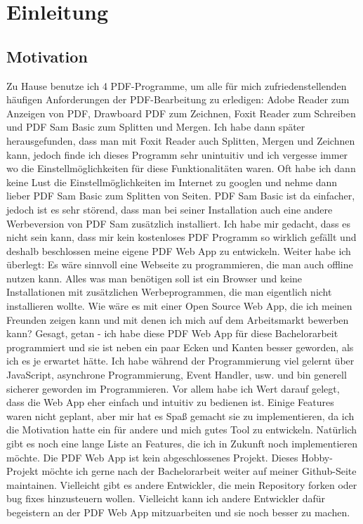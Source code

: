\chapter{Einleitung}

\section{Motivation}
Zu Hause benutze ich 4 PDF-Programme, um alle für mich zufriedenstellenden häufigen Anforderungen der PDF-Bearbeitung zu erledigen: Adobe Reader zum Anzeigen von PDF, Drawboard PDF zum Zeichnen, Foxit Reader zum Schreiben und PDF Sam Basic zum Splitten und Mergen. Ich habe dann später herausgefunden, dass man mit Foxit Reader auch Splitten, Mergen und Zeichnen kann, jedoch finde ich dieses Programm sehr unintuitiv und ich vergesse immer wo die Einstellmöglichkeiten für diese Funktionalitäten waren. Oft habe ich dann keine Lust die Einstellmöglichkeiten im Internet zu googlen und nehme dann lieber PDF Sam Basic zum Splitten von Seiten. PDF Sam Basic ist da einfacher, jedoch ist es sehr störend, dass man bei seiner Installation auch eine andere Werbeversion von PDF Sam zusätzlich installiert. Ich habe mir gedacht, dass es nicht sein kann, dass mir kein kostenloses PDF Programm so wirklich gefällt und deshalb beschlossen meine eigene PDF Web App zu entwickeln. Weiter habe ich überlegt: Es wäre sinnvoll eine Webseite zu programmieren, die man auch offline nutzen kann. Alles was man benötigen soll ist ein Browser und keine Installationen mit zusätzlichen Werbeprogrammen, die man eigentlich nicht installieren wollte. Wie wäre es mit einer Open Source Web App, die ich meinen Freunden zeigen kann und mit denen ich mich auf dem Arbeitsmarkt bewerben kann? Gesagt, getan - ich habe diese PDF Web App für diese Bachelorarbeit programmiert und sie ist neben ein paar Ecken und Kanten besser geworden, als ich es je erwartet hätte. Ich habe während der Programmierung viel gelernt über JavaScript, asynchrone Programmierung, Event Handler, usw. und bin generell sicherer geworden im Programmieren. Vor allem habe ich Wert darauf gelegt, dass die Web App eher einfach und intuitiv zu bedienen ist. Einige Features waren nicht geplant, aber mir hat es Spaß gemacht sie zu implementieren, da ich die Motivation hatte ein für andere und mich gutes Tool zu entwickeln. Natürlich gibt es noch eine lange Liste an Features, die ich in Zukunft noch implementieren möchte. Die PDF Web App ist kein abgeschlossenes Projekt. Dieses Hobby-Projekt möchte ich gerne nach der Bachelorarbeit weiter auf meiner Github-Seite maintainen. Vielleicht gibt es andere Entwickler, die mein Repository forken oder bug fixes hinzusteuern wollen. Vielleicht kann ich andere Entwickler dafür begeistern an der PDF Web App mitzuarbeiten und sie noch besser zu machen. 

